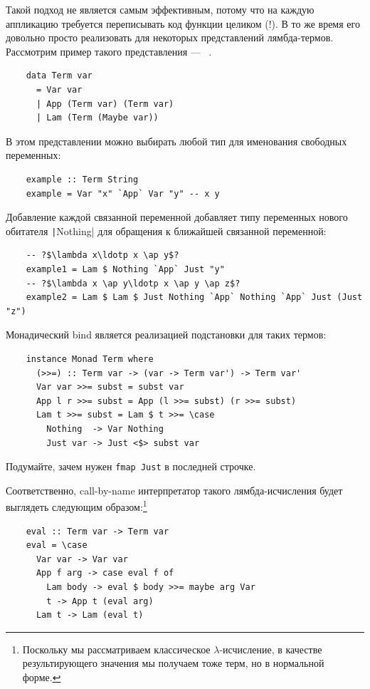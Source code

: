 Такой подход не является самым эффективным, потому что на каждую аппликацию требуется переписывать код функции целиком (!).
В то же время его довольно просто реализовать для некоторых представлений лямбда-термов.
Рассмотрим пример такого представления --- ~\cite{chargueraud2012locally}.

\begin{verbatim}
    data Term var
      = Var var
      | App (Term var) (Term var)
      | Lam (Term (Maybe var))
\end{verbatim}

В этом представлении можно выбирать любой тип для именования свободных переменных:
\begin{verbatim}
    example :: Term String
    example = Var "x" `App` Var "y" -- x y
\end{verbatim}
Добавление каждой связанной переменной добавляет типу переменных нового обитателя \texttt|Nothing| для обращения к ближайшей связанной переменной:
\begin{verbatim}
    -- ?$\lambda x\ldotp x \ap y$?
    example1 = Lam $ Nothing `App` Just "y"
    -- ?$\lambda x \ap y\ldotp x \ap y \ap z$?
    example2 = Lam $ Lam $ Just Nothing `App` Nothing `App` Just (Just "z")
\end{verbatim}

Монадический bind является реализацией подстановки для таких термов:
\begin{verbatim}
    instance Monad Term where
      (>>=) :: Term var -> (var -> Term var') -> Term var'
      Var var >>= subst = subst var
      App l r >>= subst = App (l >>= subst) (r >>= subst)
      Lam t >>= subst = Lam $ t >>= \case
        Nothing  -> Var Nothing
        Just var -> Just <$> subst var
\end{verbatim}

\begin{task}
    Подумайте, зачем нужен \texttt{fmap Just} в последней строчке.
\end{task}

Соответственно, call-by-name интерпретатор такого лямбда-исчисления будет выглядеть следующим образом:\footnote{Поскольку мы рассматриваем классическое $\lambda$-исчисление, в качестве результирующего значения мы получаем тоже терм, но в нормальной форме.}

\begin{verbatim}
    eval :: Term var -> Term var
    eval = \case
      Var var -> Var var
      App f arg -> case eval f of
        Lam body -> eval $ body >>= maybe arg Var
        t -> App t (eval arg)
      Lam t -> Lam (eval t)
\end{verbatim}

